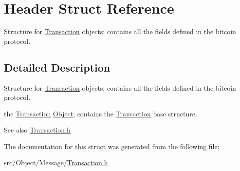 \hypertarget{struct_header}{
\section{Header Struct Reference}
\label{struct_header}
}


Structure for \hyperlink{struct_transaction}{Transaction} objects; contains all the fields defined in the bitcoin protocol.  




\subsection{Detailed Description}
Structure for \hyperlink{struct_transaction}{Transaction} objects; contains all the fields defined in the bitcoin protocol. 

the \hyperlink{struct_transaction}{Transaction} \hyperlink{struct_object}{Object}; contains the \hyperlink{struct_transaction}{Transaction} base structure. \begin{DoxySeeAlso}{See also}
\hyperlink{_transaction_8h}{Transaction.h} 
\end{DoxySeeAlso}


The documentation for this struct was generated from the following file:\begin{DoxyCompactItemize}
\item 
src/Object/Message/\hyperlink{_transaction_8h}{Transaction.h}\end{DoxyCompactItemize}
